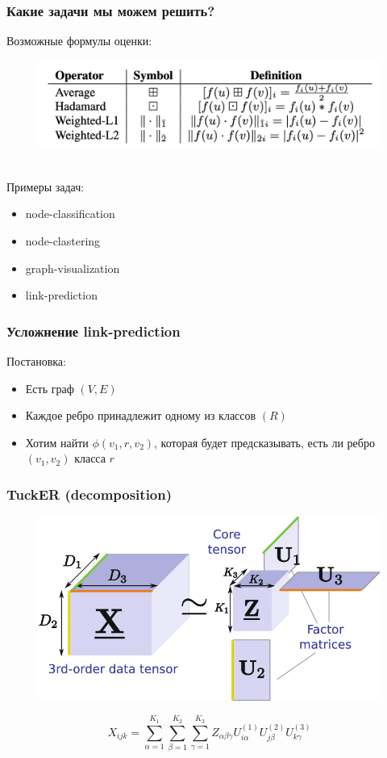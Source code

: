 \documentclass{beamer}
\newcommand{\skipline}[0]{$ $\\}
\begin{document}
\begin{frame}
    \frametitle{Какие задачи мы можем решить?}
    Возможные формулы оценки:
    \begin{figure}
        \includegraphics[width=0.75\columnwidth]{operators.png}
    \end{figure}
    \skipline
    Примеры задач:
    \begin{itemize}
        \item node-classification
        \item node-clastering
        \item graph-visualization
        \item link-prediction 
    \end{itemize}
\end{frame}

\begin{frame}
    \frametitle{Усложнение link-prediction}
    Постановка:
    \begin{itemize}
        \item Есть граф $\left(V, E\right)$
        \item Каждое ребро принадлежит одному из классов $(R)$
        \item Хотим найти $\phi(v_1, r, v_2)$, которая будет предсказывать, есть ли ребро $(v_1, v_2)$ класса $r$
    \end{itemize}
\end{frame}

\begin{frame}
    \frametitle{TuckER (decomposition)}
    \begin{figure}
        \includegraphics[width=0.6\columnwidth]{Tucker-decomposition.png}
    \end{figure}
    $$
    X_{ijk} = \sum_{\alpha=1}^{K_1} \sum_{\beta=1}^{K_2} \sum_{\gamma=1}^{K_3} 
    Z_{\alpha\beta\gamma} U^{(1)}_{i \alpha} U^{(2)}_{j \beta} U^{(3)}_{k \gamma} 
    $$
\end{frame}
\end{document}
